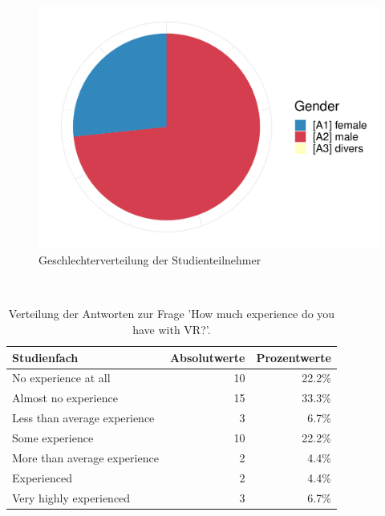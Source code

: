 \begin{figure}
	\includegraphics[width=\textwidth]{./appendices/gender}
	\caption{Geschlechterverteilung der Studienteilnehmer}
	\label{fig:gender}
\end{figure}

\begin{table}
	\caption{Verteilung der Antworten zur Frage 'How much experience do you have with VR?'.}~\label{tab:sc_results_age}
	
	\setlength\tabcolsep{3pt}
	\renewcommand{\arraystretch}{1.4}%
	\begin{tabularx}{\textwidth}{ | x || r | r | }
		\hline
		Studienfach 						& Absolutwerte 	& Prozentwerte \\ \hline\hline
		[A1] No experience at all 			& 10 			& 22.2\% \\ \hline
		[A2] Almost no experience 			& 15 			& 33.3\% \\ \hline
		[A3] Less than average experience 	& 3 			& 6.7\% \\ \hline
		[A4] Some experience 				& 10 			& 22.2\% \\ \hline
		[A5] More than average experience 	& 2 			& 4.4\% \\ \hline
		[A6] Experienced 					& 2 			& 4.4\% \\ \hline
		[A7] Very highly experienced 		& 3 			& 6.7\% \\ \hline
	\end{tabularx}
\end{table}

